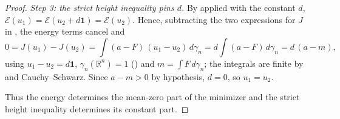 \begin{proof}
\emph{Step 3: the strict height inequality pins $d$.}
By  applied with the constant $d$,
$\mathcal{E}(u_1) = \mathcal{E}(u_2 + d\mathbf{1}) = \mathcal{E}(u_2)$.  Hence,
subtracting the two expressions for $J$ in , the
energy terms cancel and
\[
  0 = J(u_1) - J(u_2)
    = \int (a-F)\,(u_1-u_2)\, d\gamma_n
    = d \int (a-F)\, d\gamma_n
    = d\,(a-m),
\]
using $u_1 - u_2 = d\mathbf{1}$, $\gamma_n(\mathbb{R}^n) = 1$
() and $m = \int F\, d\gamma_n$; the integrals are finite by
 and Cauchy--Schwarz.  Since $a - m > 0$ by hypothesis, $d = 0$,
so $u_1 = u_2$.

Thus the energy determines the mean-zero part of the minimizer and the strict
height inequality determines its constant part.
\end{proof}
